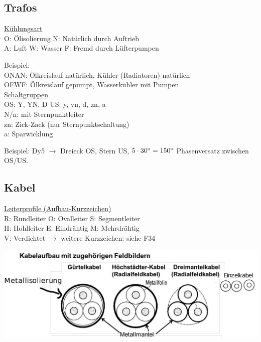 \subsection{Trafos}
\ul{Kühlungsart}\\
O: Ölisolierung \qquad N: Natürlich durch Auftrieb\\
A: Luft \qquad W: Wasser \qquad F: Fremd durch Lüfterpumpen

Beispiel:\\
ONAN: Ölkreislauf natürlich, Kühler (Radiatoren) natürlich\\
OFWF: Ölkreislauf gepumpt, Wasserkühler mit Pumpen\\

\ul{Schaltgruppen}\\
OS: Y, YN, D \qquad US: y, yn, d, zn, a\\
N/n: mit Sternpunktleiter\\
zn: Zick-Zack (nur Sternpunktschaltung)\\
a: Sparwicklung

Beispiel: Dy5 $\rightarrow$ Dreieck OS, Stern US, $5\cdot 30 \degree = 150\degree$ Phasenversatz zwischen OS/US.

\subsection{Kabel}

\ul{Leiterprofile (Aufbau-Kurzzeichen)}\\
R: Rundleiter \qquad O: Ovalleiter \qquad S: Segmentleiter\\
H: Hohlleiter \qquad E: Eindrähtig \qquad M: Mehrdrähtig \\
V: Verdichtet \quad $\rightarrow$ weitere Kurzzeichen: siehe F34

\includegraphics[width=1.0 \columnwidth]{figures/Kabelaufbau.png}

